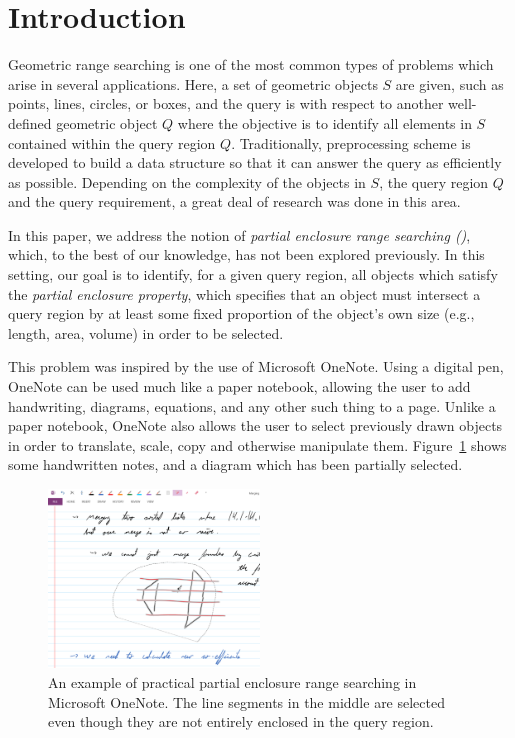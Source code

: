 \section{Introduction}
Geometric range searching is one of the most common types of 
problems which arise in several applications. Here, a set of 
geometric objects $S$ are given, such as points, lines, circles, 
or boxes, and the query is with respect to another well-defined 
geometric object $Q$ where the objective is to identify all 
elements in $S$ contained within the query region $Q$. 
Traditionally, preprocessing scheme is developed to build a data 
structure so that it can answer the query as efficiently as 
possible. Depending on the complexity of the objects in $S$, the 
query region $Q$ and the query requirement, a great deal of 
research was done in this area.  

In this paper, we address the notion of \emph{partial enclosure range searching (\PERS{})}, which, to the best of our knowledge, has not been explored previously. 
In this setting, our goal is to identify, for a given query region, all objects which satisfy the \emph{partial enclosure property}, which specifies that an object must intersect a query region by at least some fixed proportion of the object's own size (e.g., length, area, volume) in order to be selected.

This problem was inspired by the use of Microsoft OneNote. 
Using a digital pen, OneNote can be used much like a paper notebook, allowing the user to add handwriting, diagrams, equations, and any other such thing to a page.
Unlike a paper notebook, OneNote also allows the user to select previously drawn objects in order to translate, scale, copy and otherwise manipulate them.
Figure~\ref{fig:intro:onenote} shows some handwritten notes, and a diagram which has been partially selected.

\begin{figure}[t]
\begin{center}
  \includegraphics[width=0.50\textwidth]{figures/fig_onenote}
  \caption[An example of practical partial enclosure range searching]{An example of practical partial enclosure range searching in Microsoft OneNote. The line segments in the middle are selected even though they are not entirely enclosed in the query region.}
  \label{fig:intro:onenote}
\end{center}
\end{figure}

